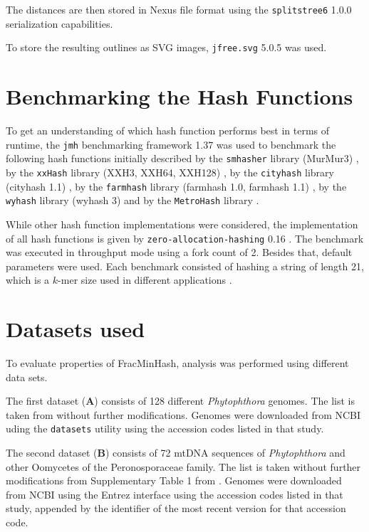 The distances are then stored in Nexus file format using the
\texttt{splitstree6} 1.0.0 \cite{husonApplicationPhylogeneticNetworks2006}
serialization capabilities.

To store the resulting outlines as SVG images, \texttt{jfree.svg} 5.0.5
\cite{gilbertJFreeSVG2023} was used.


\section{Benchmarking the Hash Functions}
To get an understanding of which hash function performs best in terms of
runtime, the \texttt{jmh} benchmarking framework 1.37
\cite{theopenjdkcommunityJavaMicrobenchmarkHarness2023} was used to benchmark
the following hash functions initially described by the \texttt{smhasher}
library (MurMur3) \cite{applebyAapplebySmhasher}, by the \texttt{xxHash} library
(XXH3, XXH64, XXH128) \cite{colletXxHash2023}, by the \texttt{cityhash} library
(cityhash 1.1) \cite{pikeCityhash2011}, by the \texttt{farmhash} library
(farmhash 1.0, farmhash 1.1) \cite{pikeFarmhash2014}, by the \texttt{wyhash}
library (wyhash 3) \cite{wangWyhash2019} and by the \texttt{MetroHash} library
\cite{rogersMetroHash2018}.
 
While other hash function implementations were considered, the implementation of
all hash functions is given by \texttt{zero-allocation-hashing} 0.16
\cite{ZeroAllocationHashing2022}. The benchmark was executed in throughput mode
using a fork count of 2. Besides that, default parameters were used. Each
benchmark consisted of hashing a string of length 21, which is a $k$-mer size
used in different applications
\cite{ondovMashFastGenome2016,bagciMicrobialPhylogeneticContext2021}.


\section{Datasets used}
To evaluate properties of FracMinHash, analysis was performed using different
data sets. 

The first dataset (\textbf{A}) consists of 128 different \textit{Phytophthora}
genomes. The list is taken from \cite{mandalComparativeGenomeAnalysis2022}
without further modifications. Genomes were downloaded from NCBI uding the
\texttt{datasets} utility \cite{sayersDatabaseResourcesNational2022} using the
accession codes listed in that study.

The second dataset (\textbf{B}) consists of 72 mtDNA sequences of
\textit{Phytophthora}
and other Oomycetes of the Peronosporaceae family. The list is taken without
further modifications from Supplementary Table 1 from
\cite{winkworthComparativeAnalysesComplete2022}. Genomes were downloaded from
NCBI using the Entrez interface \cite{sayersDatabaseResourcesNational2022} using
the accession codes listed in that study, appended by the identifier of the most
recent version for that accession code.

